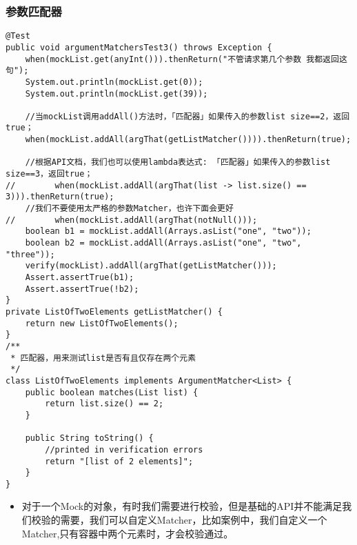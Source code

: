 \documentclass[9pt, b5paper]{article}
\begin{document}
\subsubsection{参数匹配器}
\label{sec-1-1-3}
\begin{verbatim}
@Test
public void argumentMatchersTest3() throws Exception {
    when(mockList.get(anyInt())).thenReturn("不管请求第几个参数 我都返回这句");
    System.out.println(mockList.get(0));
    System.out.println(mockList.get(39));

    //当mockList调用addAll()方法时，「匹配器」如果传入的参数list size==2，返回true；
    when(mockList.addAll(argThat(getListMatcher()))).thenReturn(true);

    //根据API文档，我们也可以使用lambda表达式: 「匹配器」如果传入的参数list size==3，返回true；
//        when(mockList.addAll(argThat(list -> list.size() == 3))).thenReturn(true);
    //我们不要使用太严格的参数Matcher，也许下面会更好
//        when(mockList.addAll(argThat(notNull()));
    boolean b1 = mockList.addAll(Arrays.asList("one", "two"));
    boolean b2 = mockList.addAll(Arrays.asList("one", "two", "three"));
    verify(mockList).addAll(argThat(getListMatcher()));
    Assert.assertTrue(b1);
    Assert.assertTrue(!b2);
}
private ListOfTwoElements getListMatcher() {
    return new ListOfTwoElements();
}
/**
 * 匹配器，用来测试list是否有且仅存在两个元素
 */
class ListOfTwoElements implements ArgumentMatcher<List> {
    public boolean matches(List list) {
        return list.size() == 2;
    }

    public String toString() {
        //printed in verification errors
        return "[list of 2 elements]";
    }
}
\end{verbatim}
\begin{itemize}
\item 对于一个Mock的对象，有时我们需要进行校验，但是基础的API并不能满足我们校验的需要，我们可以自定义Matcher，比如案例中，我们自定义一个Matcher,只有容器中两个元素时，才会校验通过。
\end{itemize}
\end{document}
